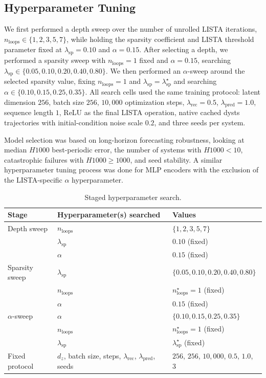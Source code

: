 \subsection{Hyperparameter Tuning}

We first performed a depth sweep over the number of unrolled LISTA iterations, \(n_{\mathrm{loops}} \in \{1,2,3,5,7\}\), while holding the sparsity coefficient and LISTA threshold parameter fixed at \(\lambda_{\mathrm{sp}}=0.10\) and \(\alpha=0.15\). After selecting a depth, we performed a sparsity sweep with \(n_{\mathrm{loops}}=1 \) fixed and \(\alpha=0.15\), searching \(\lambda_{\mathrm{sp}} \in \{0.05,0.10,0.20,0.40,0.80\}\). 
We then performed an \(\alpha\)-sweep around the selected sparsity value, fixing \(n_{\mathrm{loops}}=1\) and \(\lambda_{\mathrm{sp}}=\lambda_{\mathrm{sp}}^\star\) and searching \(\alpha \in \{0.10,0.15,0.25,0.35\}\). All search cells used the same
  training protocol: latent dimension \(256\), batch size \(256\), \(10{,}000\) optimization steps, \(\lambda_{\mathrm{rec}}=0.5\), \(\lambda_{\mathrm{pred}}
  =1.0\), sequence length \(1\), ReLU as the final LISTA operation, native cached dysts trajectories with initial-condition noise scale \(0.2\), and
  three seeds per system. 
  
  Model selection was based on long-horizon forecasting robustness, looking at median \(H1000\) best-periodic error, the number of
  systems with \(H1000<10\), catastrophic failures with \(H1000 \ge 1000\), and seed stability. A similar hyperparameter tuning process was done for MLP encoders with the exclusion of the LISTA-specific $\alpha$ hyperparameter.

  \begin{table}[ht]
  \centering
  \small
  \begin{tabular}{lll}
  \hline
  Stage & Hyperparameter(s) searched & Values \\
  \hline
  Depth sweep & \(n_{\mathrm{loops}}\) & \(\{1,2,3,5,7\}\) \\
   & \(\lambda_{\mathrm{sp}}\) & \(0.10\) (fixed) \\
   & \(\alpha\) & \(0.15\) (fixed) \\
  \hline
  Sparsity sweep & \(\lambda_{\mathrm{sp}}\) & \(\{0.05,0.10,0.20,0.40,0.80\}\) \\
   & \(n_{\mathrm{loops}}\) & \(n_{\mathrm{loops}}^\star = 1\) (fixed) \\
   & \(\alpha\) & \(0.15\) (fixed) \\
  \hline
  \(\alpha\)-sweep & \(\alpha\) & \(\{0.10,0.15,0.25,0.35\}\) \\
   & \(n_{\mathrm{loops}}\) & \(n_{\mathrm{loops}}^\star = 1\) (fixed) \\
   & \(\lambda_{\mathrm{sp}}\) & \(\lambda_{\mathrm{sp}}^\star\) (fixed) \\
  \hline

  Fixed protocol & \(d_z\), batch size, steps, \(\lambda_{\mathrm{rec}}\), \(\lambda_{\mathrm{pred}}\), seeds & \(256\), \(256\), \(10{,}000\), \(0.5\), \(1.0\),
  \(3\) \\
  \hline
  \end{tabular}
  \caption{Staged hyperparameter search.}
  \label{tab:dysts_forecasting_tuning_grid}
  \end{table}